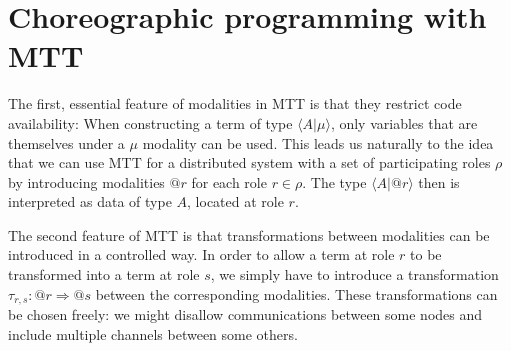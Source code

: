 \documentclass{scrartcl}
\theoremstyle{definition}
\theoremstyle{plain}
\begin{document}
\section{Choreographic programming with MTT}
The first, essential feature of modalities in MTT is that they restrict code
availability: When constructing a term of type $\langle A | \mu \rangle$, only
variables that are themselves under a $\mu$ modality can be used. This leads us
naturally to the idea that we can use MTT for a distributed system with a set
of participating roles $\rho$ by introducing modalities $@r$ for each role $r
\in \rho$. The type $\langle A | @r \rangle$ then is interpreted as data of
type $A$, located at role $r$.

The second feature of MTT is that transformations between modalities can be
introduced in a controlled way. In order to allow a term at role $r$ to be
transformed into a term at role $s$, we simply have to introduce a
transformation $\tau_{r,s} : @r \Rightarrow @s$ between the corresponding
modalities. These transformations can be chosen freely: we might disallow
communications between some nodes and include multiple channels between some
others.

\end{document}
